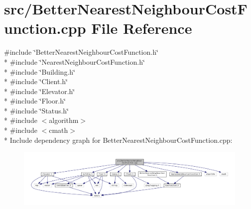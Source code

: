 \section{src/\+Better\+Nearest\+Neighbour\+Cost\+Function.cpp File Reference}
\label{_better_nearest_neighbour_cost_function_8cpp}
{\ttfamily \#include \char`\"{}Better\+Nearest\+Neighbour\+Cost\+Function.\+h\char`\"{}}\\*
{\ttfamily \#include \char`\"{}Nearest\+Neighbour\+Cost\+Function.\+h\char`\"{}}\\*
{\ttfamily \#include \char`\"{}Building.\+h\char`\"{}}\\*
{\ttfamily \#include \char`\"{}Client.\+h\char`\"{}}\\*
{\ttfamily \#include \char`\"{}Elevator.\+h\char`\"{}}\\*
{\ttfamily \#include \char`\"{}Floor.\+h\char`\"{}}\\*
{\ttfamily \#include \char`\"{}Status.\+h\char`\"{}}\\*
{\ttfamily \#include $<$algorithm$>$}\\*
{\ttfamily \#include $<$cmath$>$}\\*
Include dependency graph for Better\+Nearest\+Neighbour\+Cost\+Function.\+cpp\+:\nopagebreak
\begin{figure}[H]
\begin{center}
\leavevmode
\includegraphics[width=350pt]{_better_nearest_neighbour_cost_function_8cpp__incl}
\end{center}
\end{figure}
